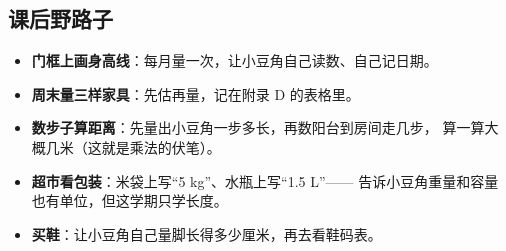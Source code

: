 \subsection{课后野路子}

\begin{itemize}
  \item \textbf{门框上画身高线}：每月量一次，让小豆角自己读数、自己记日期。
  \item \textbf{周末量三样家具}：先估再量，记在附录 D 的表格里。
  \item \textbf{数步子算距离}：先量出小豆角一步多长，再数阳台到房间走几步，
        算一算大概几米（这就是乘法的伏笔）。
  \item \textbf{超市看包装}：米袋上写“5 kg”、水瓶上写“1.5 L”——
        告诉小豆角重量和容量也有单位，但这学期只学长度。
  \item \textbf{买鞋}：让小豆角自己量脚长得多少厘米，再去看鞋码表。
\end{itemize}
